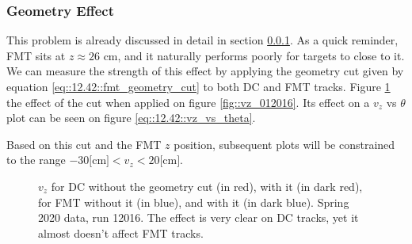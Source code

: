 \subsubsection{Geometry Effect}
\label{sssec::geometry_effect}
    This problem is already discussed in detail in section \ref{sssec::geometry_effect}.
    As a quick reminder, FMT sits at $z \approx 26$ cm, and it naturally performs poorly for targets to close to it.
    We can measure the strength of this effect by applying the geometry cut given by equation \eqref{eq::12.42::fmt_geometry_cut} to both DC and FMT tracks.
    Figure \ref{fig::vz_012016_geomcut} the effect of the cut when applied on figure \ref{fig::vz_012016}.
    Its effect on a $v_z$ vs $\theta$ plot can be seen on figure \ref{eq::12.42::vz_vs_theta}.

    Based on this cut and the FMT $z$ position, subsequent plots will be constrained to the range $-30 \text{[cm]} < v_z < 20 \text{[cm]}$.

    \begin{figure}[h!]
        \centering{}
        \caption[$v_z$ for DC and FMT, w/ and w/out the geometry cut, run 12016]{$v_z$ for DC without the geometry cut (in red), with it (in dark red), for FMT without it (in blue), and with it (in dark blue). Spring 2020 data, run 12016. The effect is very clear on DC tracks, yet it almost doesn't affect FMT tracks.}
        \label{fig::vz_012016_geomcut}
    \end{figure}

